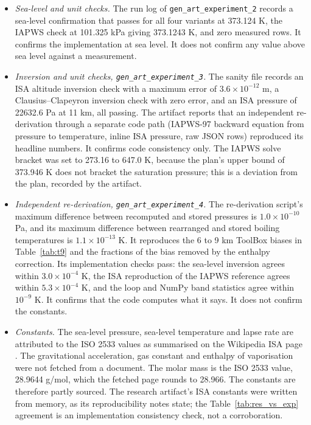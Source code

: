 \documentclass[11pt,letterpaper]{article}
\begin{document}
\begin{itemize}
\item \emph{Sea-level and unit checks.} The run log of \texttt{gen\_art\_experiment\_2} records a sea-level confirmation that passes for all four variants at 373.124 K, the IAPWS check at 101.325 kPa giving 373.1243 K, and zero measured rows. It confirms the implementation at sea level. It does not confirm any value above sea level against a measurement.
\item \emph{Inversion and unit checks, \texttt{gen\_art\_experiment\_3}.} The sanity file records an ISA altitude inversion check with a maximum error of $3.6 \times 10^{-12}$ m, a Clausius--Clapeyron inversion check with zero error, and an ISA pressure of 22632.6 Pa at 11 km, all passing. The artifact reports that an independent re-derivation through a separate code path (IAPWS-97 backward equation from pressure to temperature, inline ISA pressure, raw JSON rows) reproduced its headline numbers. It confirms code consistency only. The IAPWS solve bracket was set to 273.16 to 647.0 K, because the plan's upper bound of 373.946 K does not bracket the saturation pressure; this is a deviation from the plan, recorded by the artifact.
\item \emph{Independent re-derivation, \texttt{gen\_art\_experiment\_4}.} The re-derivation script's maximum difference between recomputed and stored pressures is $1.0 \times 10^{-10}$ Pa, and its maximum difference between rearranged and stored boiling temperatures is $1.1 \times 10^{-13}$ K. It reproduces the 6 to 9 km ToolBox biases in Table~\ref{tab:t9} and the fractions of the bias removed by the enthalpy correction. Its implementation checks pass: the sea-level inversion agrees within $3.0 \times 10^{-4}$ K, the ISA reproduction of the IAPWS reference agrees within $5.3 \times 10^{-4}$ K, and the loop and NumPy band statistics agree within $10^{-9}$ K. It confirms that the code computes what it says. It does not confirm the constants.
\item \emph{Constants.} The sea-level pressure, sea-level temperature and lapse rate are attributed to the ISO 2533 values as summarised on the Wikipedia ISA page \cite{ref3}. The gravitational acceleration, gas constant and enthalpy of vaporisation were not fetched from a document. The molar mass is the ISO 2533 value, 28.9644 g/mol, which the fetched page rounds to 28.966. The constants are therefore partly sourced. The research artifact's ISA constants were written from memory, as its reproducibility notes state; the Table~\ref{tab:res_vs_exp} agreement is an implementation consistency check, not a corroboration.

\end{itemize}
\end{document}
